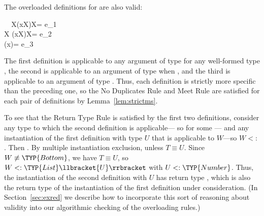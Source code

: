 \documentclass[10pt]{sigplanconf}
\newcommand{\TODO}[1]{\textbf{\emph{\textcolor{red}{TODO}}}: \textsf{\footnotesize #1}}
\newcommand{\subtypeof}{\ensuremath{<:}}
\newcommand{\ob}[1]{\ensuremath{\llbracket {#1} \rrbracket}}
\newcommand{\Bottom}{\TYP{Bottom}}
\begin{document}
The overloaded definitions for  are also valid:

\small
\begin{FortressCode}
{\tt ~~}\+\llbracket{}X\rrbracket\bigl(x\COLON {}\llbracket{}X\rrbracket\bigr)\COLON {}\llbracket{}X\rrbracket = e_1 \\
  \llbracket{}X \SHORTCUT{<} \rrbracket\bigl(x\COLON {}\llbracket{}X\rrbracket\bigr)\COLON {}\llbracket{}X\rrbracket = e_2 \\
  \bigl(x\COLON {}\llbracket{}\rrbracket\bigr)\COLON {}\llbracket{}\rrbracket = e_3\-
\end{FortressCode}
\normalsize
The first definition is applicable to any argument 
of type  for any well-formed type , 
the second is applicable to an argument 
of type  when , 
and the third is applicable to an argument 
of type .
Thus, 
each definition is strictly more specific than the preceding one, 
so the No Duplicates Rule and Meet Rule 
are satisfied for each pair of definitions by Lemma~\ref{lem:strictms}.

To see that the Return Type Rule is satisfied 
by the first two definitions, 
consider any type  
to which the second definition is applicable---%
so  for some ---%
and any instantiation of the first definition with type $U$ 
that is applicable to $W$---so $W \subtypeof$ .
Then 
.
By multiple instantiation exclusion,
unless $T \equiv U$.
Since $W \not\equiv \Bottom$, 
we have $T \equiv U$,
so $W \subtypeof \TYP{List}\ob{U}$ 
with $U \subtypeof \TYP{Number}$.
Thus, the instantiation of the second definition with $U$ 
has return type , 
which is also the return type 
of the instantiation of the first definition 
under consideration.
(In Section~\ref{sec:exred} we describe how to
incorporate this sort of reasoning about validity into our algorithmic
checking of the overloading rules.)
\end{document}
